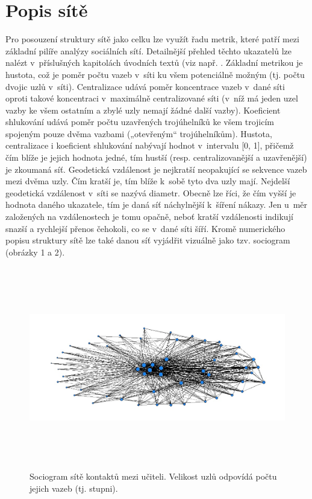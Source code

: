 \section*{Popis sítě} 

Pro posouzení struktury sítě jako celku lze využít řadu metrik, které patří mezi základní pilíře analýzy sociálních sítí. Detailnější přehled těchto ukazatelů lze nalézt v~příslušných kapitolách úvodních textů (viz např. \cite{borgatti2018analyzing, prell2012social}. Základní metrikou je hustota, což je poměr počtu vazeb v~síti ku všem potenciálně možným (tj. počtu dvojic uzlů v~síti). Centralizace udává poměr koncentrace vazeb v~dané síti oproti takové koncentraci v~maximálně centralizované síti (v~níž má jeden uzel vazby ke všem ostatním a zbylé uzly nemají žádné další vazby). Koeficient shlukování udává poměr počtu uzavřených trojúhelníků ke všem trojicím spojeným pouze dvěma vazbami („otevřeným“ trojúhelníkům). Hustota, centralizace i koeficient shlukování nabývají hodnot v~intervalu [0, 1], přičemž čím blíže je jejich hodnota jedné, tím hustší (resp. centralizovanější a uzavřenější) je zkoumaná síť. Geodetická vzdálenost je nejkratší neopakující se sekvence vazeb mezi dvěma uzly. Čím kratší je, tím blíže k~sobě tyto dva uzly mají. Nejdelší geodetická vzdálenost v~síti se nazývá diametr. Obecně lze říci, že čím vyšší je hodnota daného ukazatele, tím je daná síť náchylnější k~šíření nákazy. Jen u~měr založených na vzdálenostech je tomu opačně, neboť kratší vzdálenosti indikují snazší a rychlejší přenos čehokoli, co se v~dané síti šíří. Kromě numerického popisu struktury sítě lze také danou síť vyjádřit vizuálně jako tzv. sociogram (obrázky 1 a 2).

\begin{figure}[ht]
    \centering
    \includegraphics[width=320pt, height=250pt]{./pic/teachers_all_degree.jpg}
    \caption{Sociogram sítě kontaktů mezi učiteli. Velikost uzlů odpovídá počtu jejich vazeb (tj. stupni).}
    \label{fig:100-students}
\end{figure}

